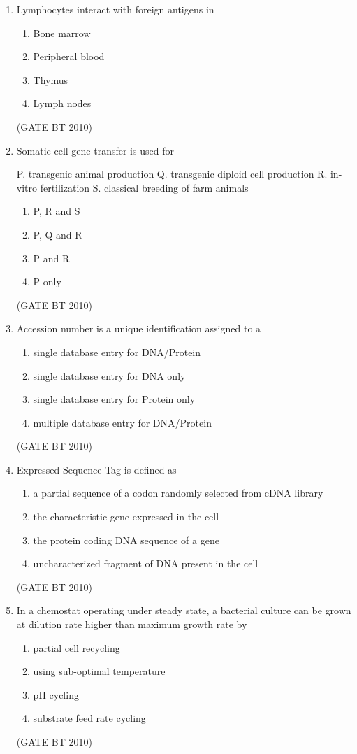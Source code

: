 \documentclass[journal,12pt,onecolumn]{IEEEtran}
\theoremstyle{remark}
\begin{document}
\begin{enumerate}
\item Lymphocytes interact with foreign antigens in  
\begin{enumerate}
   \item Bone marrow  
   \item Peripheral blood  
   \item Thymus  
   \item Lymph nodes  
\end{enumerate}
\hfill (GATE BT 2010)

\item Somatic cell gene transfer is used for  

P. transgenic animal production  
Q. transgenic diploid cell production  
R. in-vitro fertilization  
S. classical breeding of farm animals  

\begin{enumerate}
    \item P, R and S  
    \item P, Q and R  
    \item P and R  
    \item P only  
\end{enumerate}
\hfill (GATE BT 2010)

\item Accession number is a unique identification assigned to a  
\begin{enumerate}
   \item single database entry for DNA/Protein  
   \item single database entry for DNA only  
   \item single database entry for Protein only  
   \item multiple database entry for DNA/Protein  
\end{enumerate}
\hfill (GATE BT 2010)

\item Expressed Sequence Tag is defined as  
\begin{enumerate}
    \item a partial sequence of a codon randomly selected from cDNA library  
    \item the characteristic gene expressed in the cell  
    \item the protein coding DNA sequence of a gene  
    \item uncharacterized fragment of DNA present in the cell  
\end{enumerate}
\hfill (GATE BT 2010)

\item In a chemostat operating under steady state, a bacterial culture can be grown at dilution rate higher than maximum growth rate by  
\begin{enumerate}
    \item partial cell recycling  
    \item using sub-optimal temperature  
    \item pH cycling  
    \item substrate feed rate cycling  
\end{enumerate}
\hfill (GATE BT 2010)


\end{enumerate}
\end{document}
